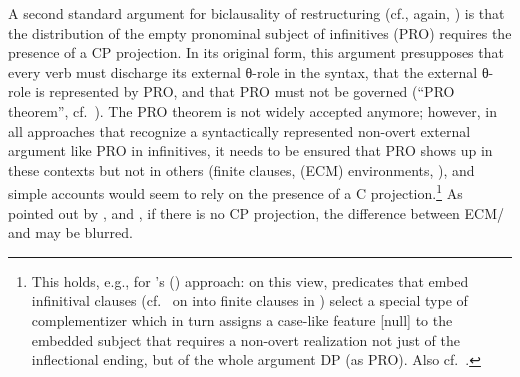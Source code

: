 \documentclass[output=paper]{langsci/langscibook}
\newcommand{\scite}[2]{\citeauthor{#2}#1 (\citeyear{#2})}
\begin{document}
A second standard argument for biclausality of restructuring (cf., again,
\citealt{Stechow&Sternefeld:88}) is that the distribution of the empty
pronominal subject of  infinitives (PRO) requires the presence of a CP
projection.  In its original form, this argument presupposes that every verb
must discharge its external θ-role in the syntax, that the external
θ-role is represented by PRO, and that PRO must not be governed (``PRO
theorem'', cf.\ \citealt{Chomsky:81}). The PRO theorem is not widely accepted
anymore; however, in all approaches that recognize a syntactically represented
non-overt external argument like PRO in  infinitives, it needs to be
ensured that PRO shows up in these contexts but not in others (finite clauses,
 (\gls{ECM}) environments, ), and simple accounts
would seem to rely on the presence of a C projection.\footnote{\label{pro3}This
    holds, e.g., for \scite{'s}{Adger:2003a} approach: on this view, 
    predicates that embed infinitival clauses (cf.\ \citealt{Stiebels:10:inh}
    on  into finite clauses in ) select a special type of
    complementizer which in turn assigns a case-like feature [null] to the
    embedded subject that requires a non-overt realization not just of the
inflectional ending, but of the whole argument DP (as PRO). Also cf.\
\cite{Chomsky&Lasnik:93,Roberts:97:res}.} As pointed out by
\citet{Stechow&Sternefeld:88}, and \citet{Sternefeld:90:pro}, if there is no CP
projection, the difference between \is{exceptional case marking}ECM/ and  may be blurred.\largerpage[2]
\end{document}
